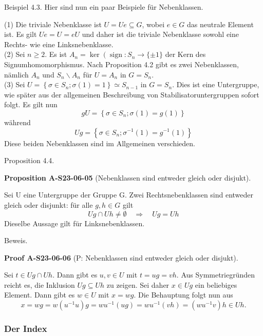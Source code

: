 \documentclass[10pt, letterpaper]{article}
\newcommand{\CustomHeading}[3]{%
  \par\medskip\noindent%
  \textbf{#1 #2} \textnormal{(#3)}.\enskip%
}
\newenvironment{PROP}[2]{\begin{unitbox}\CustomHeading{Proposition}{#1}{#2}}{\end{unitbox}}
\newenvironment{PROOF}[2]{\begin{unitbox}\CustomHeading{Proof}{#1}{#2}}{\end{unitbox}}
\begin{document}
Beispiel 4.3. Hier sind nun ein paar Beispiele für Nebenklassen.

(1) Die triviale Nebenklasse ist $U=U e \subseteq G$, wobei $e \in G$ das neutrale Element ist. Es gilt $U e=U=e U$ und daher ist die triviale Nebenklasse sowohl eine Rechts- wie eine Linksnebenklasse.\\


(2) Sei $n \geq 2$. Es ist $A_{n}=\operatorname{ker}\left(\operatorname{sign}: S_{n} \rightarrow\{ \pm 1\}\right.$ der Kern des Signumhomomorphismus. Nach Proposition 4.2 gibt es zwei Nebenklassen, nämlich $A_{n}$ und $S_{n} \backslash A_{n}$ für $U=A_{n}$ in $G=S_{n}$.\\


(3) Sei $U=\left\{\sigma \in S_{n} ; \sigma(1)=1\right\} \simeq S_{n-1}$ in $G=S_{n}$. Dies ist eine Untergruppe, wie später aus der allgemeinen Beschreibung von Stabilisatoruntergruppen sofort folgt. Es gilt nun
$$
g U=\left\{\sigma \in S_{n} ; \sigma(1)=g(1)\right\}
$$
während
$$
U g=\left\{\sigma \in S_{n} ; \sigma^{-1}(1)=g^{-1}(1)\right\}
$$
Diese beiden Nebenklassen sind im Allgemeinen verschieden.



Proposition 4.4. 


\begin{PROP}{A-S23-06-05}{Nebenklassen sind entweder gleich oder disjukt}
Sei U eine Untergruppe der Gruppe G. Zwei Rechtsnebenklassen sind entweder gleich oder disjunkt: für alle $g, h \in G$ gilt
$$
U g \cap U h \neq \emptyset \quad \Longrightarrow \quad U g=U h
$$
Dieselbe Aussage gilt für Linksnebenklassen.
\end{PROP}


Beweis. 


\begin{PROOF}{A-S23-06-06}{P: Nebenklassen sind entweder gleich oder disjukt}
Sei $t \in U g \cap U h$. Dann gibt es $u, v \in U$ mit $t=u g=v h$. Aus Symmetriegründen reicht es, die Inklusion $U g \subseteq U h$ zu zeigen. Sei daher $x \in U g$ ein beliebiges Element. Dann gibt es $w \in U$ mit $x=w g$. Die Behauptung folgt nun aus
$$
x=w g=w\left(u^{-1} u\right) g=w u^{-1}(u g)=w u^{-1}(v h)=\left(w u^{-1} v\right) h \in U h .
$$
\end{PROOF}






\subsubsection{Der Index}
\end{document}
